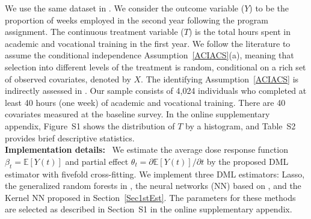 \documentclass[lettersize, 12pt]{article}
\begin{document}
We use the same dataset in \cite{HHLP}.
We consider the outcome variable ($Y$) to be the proportion of weeks employed in the second year following the program assignment.
The continuous treatment variable ($T$) is the total hours spent in academic and vocational training in the first year.
We follow the literature to assume the conditional independence Assumption~\ref{ACIACS}(a), meaning that selection into different levels of the treatment is random, conditional on a rich set of observed covariates, denoted by $X$. 
The identifying Assumption~\ref{ACIACS} is indirectly assessed in \cite{FFGN12ReStat}.
Our sample consists of 4,024 individuals who completed at least 40 hours (one week) of academic and vocational training.
There are 40 covariates measured at the baseline survey.
 In the online supplementary appendix, Figure~S1 shows the distribution of $T$ by a histogram, and Table~S2 provides brief descriptive statistics.
\\[5pt]
\textbf{Implementation details:}\
We estimate the average dose response function $\beta_t = \mathbb{E}[Y(t)]$ and partial effect $\theta_t = \partial \mathbb{E}[Y(t)]/\partial t$  by the proposed DML estimator with fivefold cross-fitting.
We implement three DML estimators: Lasso, the generalized random forests in \cite{ATW19AS}, the neural networks (NN) based on \cite{Farrell18},
and the Kernel NN proposed in Section~\ref{Sec1stEst}.  %
The parameters for these methods are selected as described in Section~S1 in the online supplementary appendix.
\end{document}
